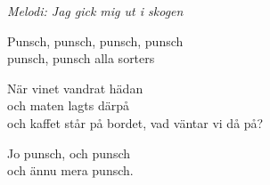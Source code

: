 {\footnotesize\textit{Melodi: Jag gick mig ut i skogen}}\par
\vspace{10pt}
\revrpt Punsch, punsch, punsch, punsch\\
punsch, punsch alla sorters\rpt\par
\vspace{10pt}
När vinet vandrat hädan\\
och maten lagts därpå\\
och kaffet står på bordet, vad väntar vi då på?\par
\vspace{10pt}
\revrpt Jo punsch, och punsch\\
och ännu mera punsch.\rpt

